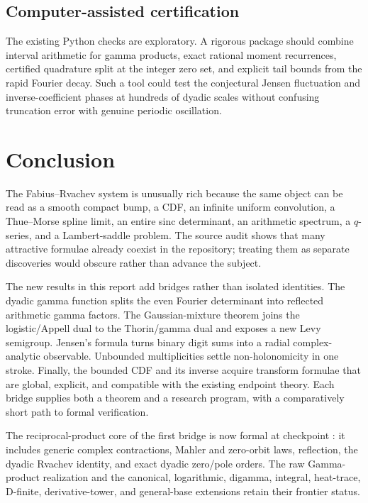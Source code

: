 \documentclass[11pt]{article}
\theoremstyle{definition}
\theoremstyle{remark}
\begin{document}
\subsection{Computer-assisted certification}

The existing Python checks are exploratory.  A rigorous package should combine interval
arithmetic for gamma products, exact rational moment recurrences, certified quadrature split
at the integer zero set, and explicit tail bounds from the rapid Fourier decay.  Such a tool
could test the conjectural Jensen fluctuation and inverse-coefficient phases at hundreds of
dyadic scales without confusing truncation error with genuine periodic oscillation.

\section{Conclusion}

The Fabius--Rvachev system is unusually rich because the same object can be read as a smooth
compact bump, a CDF, an infinite uniform convolution, a Thue--Morse spline limit, an entire
sinc determinant, an arithmetic spectrum, a $q$-series, and a Lambert-saddle problem.  The
source audit shows that many attractive formulae already coexist in the repository; treating
them as separate discoveries would obscure rather than advance the subject.

The new results in this report add bridges rather than isolated identities.  The dyadic gamma
function splits the even Fourier determinant into reflected arithmetic gamma factors.  The
Gaussian-mixture theorem joins the logistic/Appell dual to the Thorin/gamma dual and exposes a
new Levy semigroup.  Jensen's formula turns binary digit sums into a radial complex-analytic
observable.  Unbounded multiplicities settle non-holonomicity in one stroke.  Finally, the
bounded CDF and its inverse acquire transform formulae that are global, explicit, and
compatible with the existing endpoint theory.  Each bridge supplies both a theorem and a
research program, with a comparatively short path to formal verification.

The reciprocal-product core of the first bridge is now formal at checkpoint
: it includes generic complex contractions,
Mahler and zero-orbit laws, reflection, the dyadic Rvachev identity, and exact dyadic
zero/pole orders.  The raw Gamma-product realization and the canonical, logarithmic,
digamma, integral, heat-trace, D-finite, derivative-tower, and general-base extensions retain
their frontier status.
\end{document}
